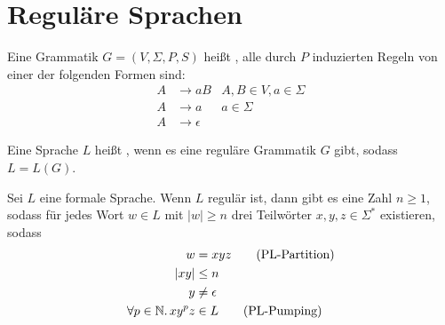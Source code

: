 \section{Reguläre Sprachen}

\begin{definition}
	Eine Grammatik $G = (V, \Sigma, P, S)$ heißt , alle durch
	$P$ induzierten Regeln von einer der folgenden Formen sind:
	\begin{align*}
		A & \rightarrow aB & A,B \in V, a \in \Sigma \\
		A & \rightarrow a & a \in \Sigma \\
		A & \rightarrow \epsilon
	\end{align*}
\end{definition}

\begin{definition}
	Eine Sprache $L$ heißt , wenn es eine reguläre Grammatik
	$G$ gibt, sodass $L = L(G)$.
\end{definition}

\begin{theorem}
	Sei $L$ eine formale Sprache.
	Wenn $L$ regulär ist, dann gibt es eine Zahl $n \geq 1$, sodass für
	jedes Wort $w \in L$ mit $|w| \geq n$ drei Teilwörter $x,y,z \in
	\Sigma^*$ existieren, sodass
	\begin{align}
		w & = xyz \tag{PL-Partition}\label{thinf:reg:pl-partition} \\
		|xy| & \leq n \label{thinf:reg:pl-beginning} \\
		y & \neq \epsilon \label{thinf:reg:pl-midnotempty} \\
		\forall p \in \mathbb{N}.\, xy^pz & \in L
		\tag{PL-Pumping}\label{thinf:reg:pl-pumping}
	\end{align}
\end{theorem}

